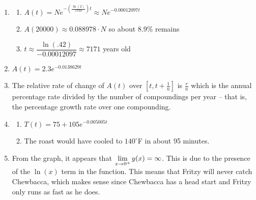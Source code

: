 \begin{enumerate}
\begin{enumerate}
\begin{multicols}{6}
\begin{itemize}
\item $\approx 2.500$

\item $\approx 2.498$

\item$\approx 2.487$

\end{itemize}

\end{multicols}

\end{enumerate}


\item \begin{enumerate}

\item $A(t) = Ne^{-\left(\frac{\ln(2)}{5730}\right)t} \approx Ne^{-0.00012097t}$
\item $A(20000) \approx 0.088978 \cdot N$ so about 8.9\% remains
\item $t \approx \dfrac{\ln(.42)}{-0.00012097} \approx 7171$ years old

\end{enumerate}

\item $A(t) = 2.3e^{-0.0138629t}$

\item  The relative rate of change of $A(t)$ over $\left[t, t+\frac{1}{n} \right]$ is $\frac{r}{n}$ which is the annual percentage rate divided by the number of compoundings per year -- that is,  the percentage growth rate over one compounding.

\addtocounter{enumi}{1}

\item \begin{enumerate}

\item $T(t) = 75 + 105e^{-0.005005t}$

\item The roast would have cooled to $140^{\circ}$F in about 95 minutes.

\end{enumerate}

\item From the graph, it appears that $\displaystyle{\lim_{x \rightarrow 0^{+}} y(x) = \infty}$.  This is due to the presence of the $\ln(x)$ term in the function.  This means that Fritzy will never catch Chewbacca, which makes sense since Chewbacca has a head start and Fritzy only runs as fast as he does.


\end{enumerate}
